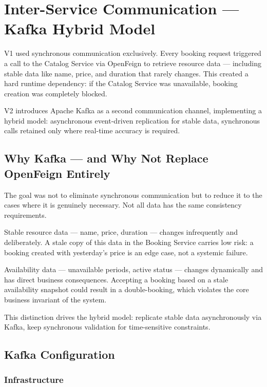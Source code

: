 \section{Inter-Service Communication --- Kafka Hybrid Model}

V1 used synchronous communication exclusively. Every booking request triggered a call to the Catalog Service via OpenFeign to retrieve resource data --- including stable data like name, price, and duration that rarely changes. This created a hard runtime dependency: if the Catalog Service was unavailable, booking creation was completely blocked.

V2 introduces Apache Kafka as a second communication channel, implementing a hybrid model: asynchronous event-driven replication for stable data, synchronous calls retained only where real-time accuracy is required.

\subsection{Why Kafka --- and Why Not Replace OpenFeign Entirely}

The goal was not to eliminate synchronous communication but to reduce it to the cases where it is genuinely necessary. Not all data has the same consistency requirements.

Stable resource data --- name, price, duration --- changes infrequently and deliberately. A stale copy of this data in the Booking Service carries low risk: a booking created with yesterday's price is an edge case, not a systemic failure.

Availability data --- unavailable periods, active status --- changes dynamically and has direct business consequences. Accepting a booking based on a stale availability snapshot could result in a double-booking, which violates the core business invariant of the system.

This distinction drives the hybrid model: replicate stable data asynchronously via Kafka, keep synchronous validation for time-sensitive constraints.

\subsection{Kafka Configuration}

\subsubsection{Infrastructure}

